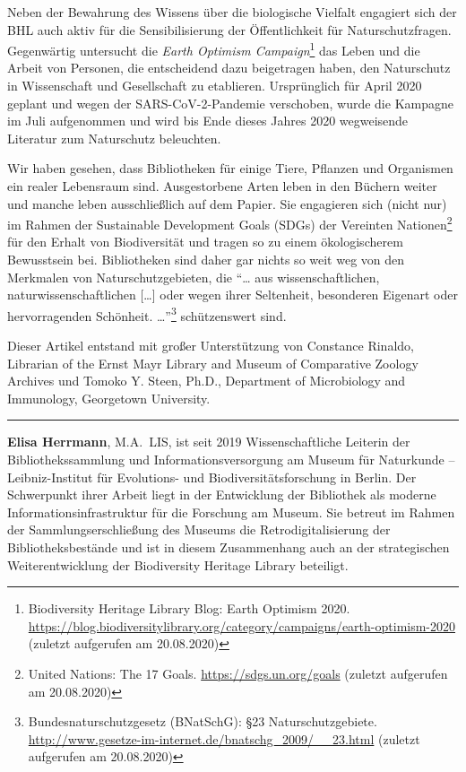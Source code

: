\documentclass[a4paper,
fontsize=11pt,
oneside,
numbers=noperiodatend,
parskip=half-,
bibliography=totoc,
final
]{scrartcl}
\begin{document}
Neben der Bewahrung des Wissens über die biologische Vielfalt engagiert
sich der BHL auch aktiv für die Sensibilisierung der Öffentlichkeit für
Naturschutzfragen. Gegenwärtig untersucht die \emph{Earth Optimism
Campaign}\footnote{Biodiversity Heritage Library Blog: Earth Optimism
  2020.
  \url{https://blog.biodiversitylibrary.org/category/campaigns/earth-optimism-2020}
  (zuletzt aufgerufen am 20.08.2020)} das Leben und die Arbeit von
Personen, die entscheidend dazu beigetragen haben, den Naturschutz in
Wissenschaft und Gesellschaft zu etablieren. Ursprünglich für April 2020
geplant und wegen der SARS-CoV-2-Pandemie verschoben, wurde die Kampagne
im Juli aufgenommen und wird bis Ende dieses Jahres 2020 wegweisende
Literatur zum Naturschutz beleuchten.

Wir haben gesehen, dass Bibliotheken für einige Tiere, Pflanzen und
Organismen ein realer Lebensraum sind. Ausgestorbene Arten leben in den
Büchern weiter und manche leben ausschließlich auf dem Papier. Sie
engagieren sich (nicht nur) im Rahmen der Sustainable Development Goals
(SDGs) der Vereinten Nationen\footnote{United Nations: The 17 Goals.
  \url{https://sdgs.un.org/goals} (zuletzt aufgerufen am 20.08.2020)}
für den Erhalt von Biodiversität und tragen so zu einem ökologischerem
Bewusstsein bei. Bibliotheken sind daher gar nichts so weit weg von den
Merkmalen von Naturschutzgebieten, die \enquote{\ldots{} aus
wissenschaftlichen, naturwissenschaftlichen {[}\ldots{]} oder wegen
ihrer Seltenheit, besonderen Eigenart oder hervorragenden Schönheit.
\ldots{}}\footnote{Bundesnaturschutzgesetz (BNatSchG): §23
  Naturschutzgebiete.
  \url{http://www.gesetze-im-internet.de/bnatschg_2009/__23.html}
  (zuletzt aufgerufen am 20.08.2020)} schützenswert sind.

Dieser Artikel entstand mit großer Unterstützung von Constance Rinaldo,
Librarian of the Ernst Mayr Library and Museum of Comparative Zoology
Archives und Tomoko Y. Steen, Ph.D., Department of Microbiology and
Immunology, Georgetown University.

\begin{center}\rule{0.5\linewidth}{0.5pt}\end{center}

\textbf{Elisa Herrmann}, M.A.~LIS, ist seit 2019
Wissenschaftliche Leiterin der Bibliothekssammlung und
Informationsversorgung am Museum für Naturkunde -- Leibniz-Institut für
Evolutions- und Biodiversitätsforschung in Berlin. Der Schwerpunkt ihrer
Arbeit liegt in der Entwicklung der Bibliothek als moderne
Informationsinfrastruktur für die Forschung am Museum. Sie betreut im
Rahmen der Sammlungserschließung des Museums die Retrodigitalisierung
der Bibliotheksbestände und ist in diesem Zusammenhang auch an der
strategischen Weiterentwicklung der Biodiversity Heritage Library
beteiligt.
\end{document}
